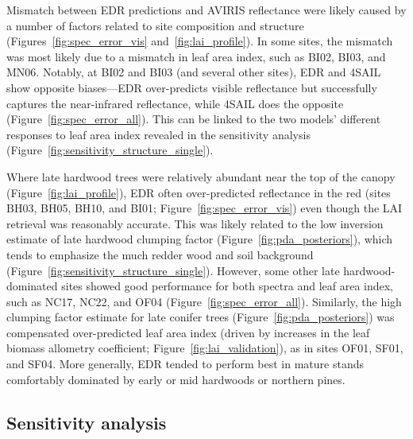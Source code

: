 
Mismatch between EDR predictions and AVIRIS reflectance were likely caused by a number of factors related to site composition and structure (Figures~\ref{fig:spec_error_vis} and~\ref{fig:lai_profile}).
In some sites, the mismatch was most likely due to a mismatch in leaf area index, such as BI02, BI03, and MN06.
Notably, at BI02 and BI03 (and several other sites), EDR and 4SAIL show opposite biases---EDR over-predicts visible reflectance but successfully captures the near-infrared reflectance, while 4SAIL does the opposite (Figure~\ref{fig:spec_error_all}).
This can be linked to the two models' different responses to leaf area index revealed in the sensitivity analysis (Figure~\ref{fig:sensitivity_structure_single}).

Where late hardwood trees were relatively abundant near the top of the canopy (Figure~\ref{fig:lai_profile}), EDR often over-predicted reflectance in the red (sites BH03, BH05, BH10, and BI01; Figure~\ref{fig:spec_error_vis}) even though the LAI retrieval was reasonably accurate.
This was likely related to the low inversion estimate of late hardwood clumping factor (Figure~\ref{fig:pda_posteriors}), which tends to emphasize the much redder wood and soil background (Figure~\ref{fig:sensitivity_structure_single}).
However, some other late hardwood-dominated sites showed good performance for both spectra and leaf area index, such as NC17, NC22, and OF04 (Figure~\ref{fig:spec_error_all}).
Similarly, the high clumping factor estimate for late conifer trees (Figure~\ref{fig:pda_posteriors}) was compensated over-predicted leaf area index (driven by increases in the leaf biomass allometry coefficient; Figure~\ref{fig:lai_validation}), as in sites OF01, SF01, and SF04.
More generally, EDR tended to perform best in mature stands comfortably dominated by early or mid hardwoods or northern pines.

\subsection{Sensitivity analysis}

